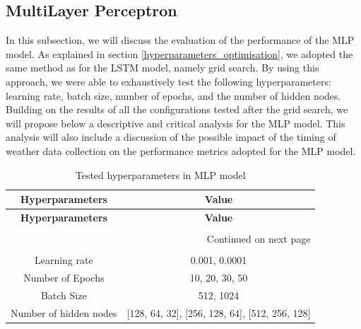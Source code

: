 \documentclass[12pt,oneside]{book} %
\begin{document}
\subsection{MultiLayer Perceptron}

\noindent In this subsection, we will discuss the evaluation of the performance of the MLP model. As explained in section \ref{hyperparameters_optimisation}, we adopted the same method as for the LSTM model, namely grid search. By using this approach, we were able to exhaustively test the following hyperparameters: learning rate, batch size, number of epochs, and the number of hidden nodes. Building on the results of all the configurations tested after the grid search, we will propose below a descriptive and critical analysis for the MLP model. This analysis will also include a discussion of the possible impact of the timing of weather data collection on the performance metrics adopted for the MLP model.

\setlength\LTleft{1.7cm}
\begin{longtable}{c c}
\caption{Tested hyperparameters in MLP model} \label{tab:MLP_hyperparameters} 
\\\hline
\textbf{Hyperparameters} & \textbf{Value} \\ \hline
\endfirsthead

\hline
\textbf{Hyperparameters} & \textbf{Value}  \\ \hline
&\\
\endhead

\hline \multicolumn{2}{r}{{Continued on next page}} \\ \hline
&\\
\endfoot

\hline
\endlastfoot
Learning rate & 0.001, 0.0001\\
Number of Epochs &  10, 20, 30, 50\\ 
Batch Size & 512, 1024\\ 
Number of hidden nodes & [128, 64, 32], [256, 128, 64], [512, 256, 128]\\
\end{longtable}
\end{document}
